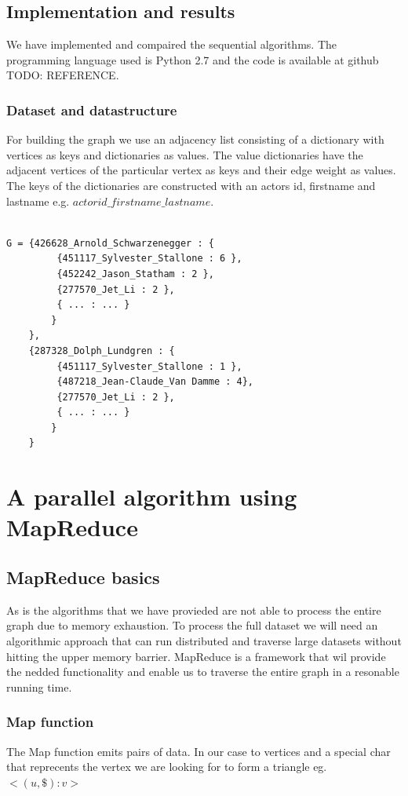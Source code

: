 \documentclass{article}
\begin{document}
\subsection{Implementation and results}
We have implemented and compaired the sequential algorithms. The programming language used is Python 2.7 and the code is available at github TODO: REFERENCE.

\subsubsection{Dataset and datastructure}
For building the graph we use an adjacency list consisting of a dictionary with vertices as keys and dictionaries as values. The value dictionaries have the adjacent vertices of the particular vertex as keys and their edge weight as values. The keys of the dictionaries are constructed with an actors id, firstname and lastname e.g. $actorid\_firstname\_lastname$.

\begin{lstlisting}

G = {426628_Arnold_Schwarzenegger : {
 		 {451117_Sylvester_Stallone : 6 },
 		 {452242_Jason_Statham : 2 },
 		 {277570_Jet_Li : 2 },
 		 { ... : ... }
 		}
 	},	
	{287328_Dolph_Lundgren : {
		 {451117_Sylvester_Stallone : 1 },
		 {487218_Jean-Claude_Van Damme : 4},
	 	 {277570_Jet_Li : 2 },
	 	 { ... : ... }
	 	}
	}
 \end{lstlisting}

\section{A parallel algorithm using MapReduce}

\subsection{MapReduce basics}
As is the algorithms that we have provieded are not able to process the entire graph due to memory exhaustion. To process the full dataset we will need an algorithmic approach that can run distributed and traverse large datasets without hitting the upper memory barrier. MapReduce is a framework that wil provide the nedded functionality and enable us to traverse the entire graph in a resonable running time.

\subsubsection{Map function}
The Map function emits pairs of data. In our case to vertices and a special char that reprecents the vertex we are looking for to form a triangle eg. $<(u,\$):v>$
\end{document}
